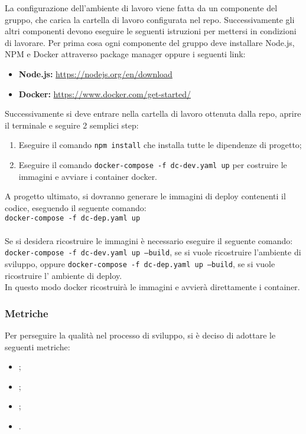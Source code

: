La configurazione dell’ambiente di lavoro viene fatta da un componente del gruppo, che carica la cartella
di lavoro configurata nel repo. Successivamente gli altri componenti devono eseguire le seguenti istruzioni
per mettersi in condizioni di lavorare. Per prima cosa ogni componente del gruppo deve installare Node.js, NPM e Docker
attraverso package manager oppure i seguenti link:
\begin{itemize}
    \item \textbf{Node.js:} \url{https://nodejs.org/en/download}
    \item \textbf{Docker:} \url{https://www.docker.com/get-started/}
\end{itemize}
Successivamente si deve entrare nella cartella di lavoro ottenuta dalla repo, aprire il terminale e seguire 2 semplici step:
\begin{enumerate}
    \item Eseguire il comando \texttt{npm install} che installa tutte le dipendenze di progetto;
    \item Eseguire il comando \texttt{docker-compose -f dc-dev.yaml up} per costruire le immagini e avviare i container docker.
\end{enumerate}
A progetto ultimato, si dovranno generare le immagini di deploy contenenti il codice, eseguendo il seguente comando:\\
\texttt{docker-compose -f dc-dep.yaml up}\\\\
Se si desidera ricostruire le immagini è necessario eseguire il seguente comando:\\
\texttt{docker-compose -f dc-dev.yaml up --build}, se si vuole ricostruire l'ambiente di sviluppo,
oppure \texttt{docker-compose -f dc-dep.yaml up --build}, se si vuole ricostruire l' ambiente di deploy.\\
In questo modo docker ricostruirà le immagini e avvierà direttamente i container.




\subsubsection{Metriche}
Per perseguire la qualità nel processo di sviluppo, si è deciso di adottare le
seguenti metriche:
\begin{itemize}
    \item {};
    \item {};
    \item {};
    \item {}.
\end{itemize}

